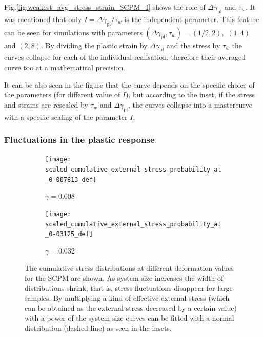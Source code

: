 Fig.\ref{fig:weakest_avg_stress_strain_SCPM_I} shows the role of $\Delta {\gamma _{{\text{pl}}}}$ and ${\tau _w}$. It was mentioned that only $I = \Delta {\gamma _{{\text{pl}}}}/{\tau _w}$ is the independent parameter. This feature can be seen for simulations with parameters $\left( {\Delta {\gamma _{{\text{pl}}}},{\tau _w}} \right) = \left( {1/2,2} \right),$ $\left( {1,4} \right)$ and $\left( {2,8} \right)$. By dividing the plastic strain by ${\Delta {\gamma _{{\text{pl}}}}}$ and the stress by ${\tau _w}$ the curves collapse for each of the individual realisation, therefore their averaged curve too at a mathematical precision.

It can be also seen in the figure that the curve depends on the specific choice of the parameters (for different value of $I$), but according to the inset, if the stress and strains are rescaled by ${\tau _w}$ and $\Delta {\gamma _{{\text{pl}}}}$, the curves collapse into a mastercurve with a specific scaling of the parameter $I$.


\subsubsection{Fluctuations in the plastic response}


\begin{figure}[htbp!] 
  \centering
  \begin{subfigure}[b]{0.48\textwidth}
    \texttt{[image: scaled\_cumulative\_external\_stress\_probability\_at\_0-007813\_def]}
    \caption{$\gamma  = 0.008$}
    \label{fig:weakest_stress_distrib_scpma}   
  \end{subfigure}          
  \begin{subfigure}[b]{0.48\textwidth}
    \texttt{[image: scaled\_cumulative\_external\_stress\_probability\_at\_0-03125\_def]}
    \caption{$\gamma  = 0.032$}
    \label{fig:weakest_stress_distrib_scpmc}
  \end{subfigure}
  \caption[Fluctuations in the plastic response for the SCPM]{The cumulative stress distributions at different deformation values for the SCPM are shown. As system size increases the width of distributions shrink, that is, stress fluctuations disappear for large samples. By multiplying a kind of effective external stress (which can be obtained as the external stress decreased by a certain value) with a power of the system size curves can be fitted with a normal distribution (dashed line) as seen in the insets.}
  \label{fig:weakest_stress_distrib_scpm}
\end{figure}

